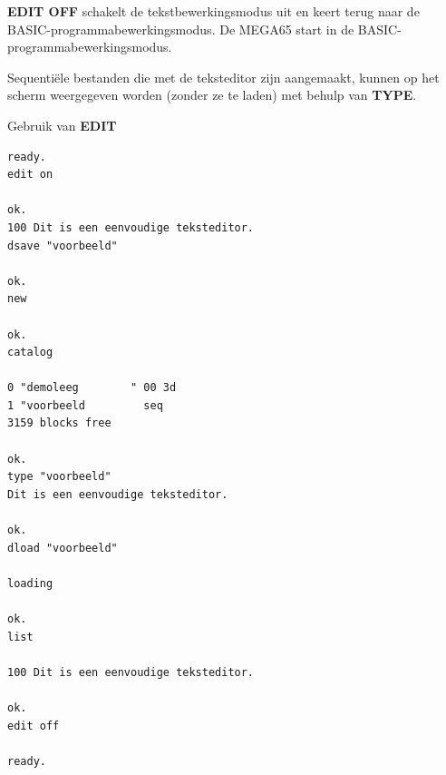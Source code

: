 \begin{description}[leftmargin=2cm,style=nextline]
                  {\bf EDIT OFF} schakelt de tekstbewerkingsmodus uit en keert terug naar de BASIC-programmabewerkingsmodus. De MEGA65 start in de BASIC-programmabewerkingsmodus.

                  Sequentiële bestanden die met de teksteditor zijn aangemaakt, kunnen op het scherm weergegeven worden (zonder ze te laden) met behulp van {\bf TYPE}.

\item [Voorbeelden:] Gebruik van {\bf EDIT}

\begin{tcolorbox}[colback=black,coltext=white]
\verbatimfont{\codefont}
\begin{verbatim}
ready.
edit on

ok.
100 Dit is een eenvoudige teksteditor.
dsave "voorbeeld"

ok.
new

ok.
catalog

0 "demoleeg        " 00 3d
1 "voorbeeld         seq
3159 blocks free

ok.
type "voorbeeld"
Dit is een eenvoudige teksteditor.

ok.
dload "voorbeeld"

loading

ok.
list

100 Dit is een eenvoudige teksteditor.

ok.
edit off

ready.
\end{verbatim}
\end{tcolorbox}
\end{description}


\newpage
